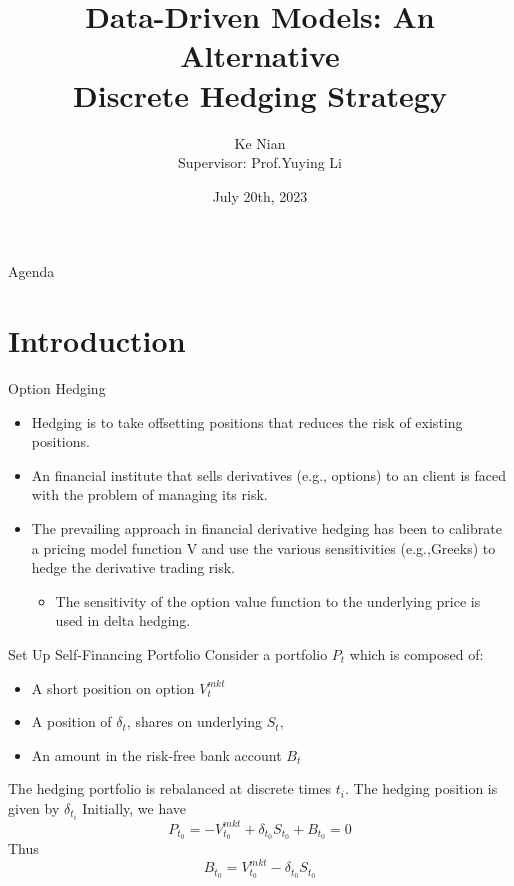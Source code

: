 \documentclass[10pt,table,mathserif]{beamer}
\title[Data-Driven Models: An Alternative
Discrete Hedging Strategy]%
{Data-Driven Models: An Alternative \\
Discrete Hedging Strategy}
\author[Ke Nian ] %
{ Ke Nian\\
 Supervisor: Prof.Yuying Li
}
\institute[
  David R. Cheriton School of Computer Science, University of Waterloo
] %
{%
  David R. Cheriton School of Computer Science,\\
  University of Waterloo,\\
  Waterloo, Canada
}
\date{July 20th, 2023}
\newcommand{\Vmkt}{V^{mkt}}
\newcommand{\Smkt}{S}
\begin{document}
\begin{frame}[plain] %
  \titlepage
\end{frame}

\begin{frame}{Agenda}{}
\tableofcontents
\end{frame}

\section{Introduction}
\begin{frame}{Option Hedging}
\begin{itemize}
\item Hedging is to take  offsetting positions that reduces the  risk of existing positions. 
\item An financial institute that sells derivatives (e.g., options) to an client is faced with the problem of managing its risk.  
\item The prevailing approach in financial derivative hedging has been to calibrate a pricing model function V and use the various sensitivities (e.g.,Greeks) to hedge the derivative trading risk. 
\begin{itemize}
	  \item The sensitivity of the option value function to the underlying price is used in delta hedging.
\end{itemize}
\end{itemize}
\end{frame}
\begin{frame}{Set Up Self-Financing Portfolio}
Consider a portfolio $P_{t}$ which is composed of:
\begin{itemize}
\item A short position on option $\Vmkt_{t}$
\item A position of $\delta_{t}$, shares on underlying $\Smkt_{t}$,
\item An amount in the risk-free bank account $B_t$
\end{itemize}
\vspace{0.3cm}
The hedging portfolio is rebalanced at discrete times $t_i$. The hedging position is given by $\delta_{t_i}$
Initially, we have
\[
P_{t_0}=  -\Vmkt_{t_0}+\delta_{t_0} \Smkt_{t_0}+ B_{t_0}=0
\]
Thus
\[
B_{t_0}=\Vmkt_{t_0}-\delta_{t_0} \Smkt_{t_0}
\]
\end{frame}
\end{document}
